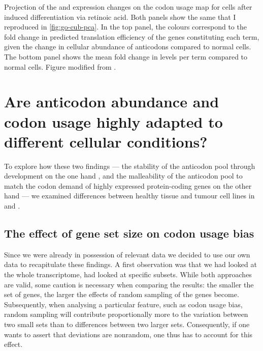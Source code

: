     {Projection of the \trna and \mrna expression changes on the codon usage
    map for cells after induced differentiation via retinoic acid.}
    {Both panels show the same \pca that I reproduced in \cref{fig:go-cub-pca}.
    In the top panel, the colours correspond to the fold change in predicted
    translation efficiency of the genes constituting each \go term, given the
    change in cellular abundance of \trna anticodons compared to normal cells.
    The bottom panel shows the mean fold change in \mrna levels per \go term
    compared to normal cells. Figure modified from \citet{Gingold:2014}.}

\section{Are  anticodon abundance and codon usage highly adapted to
different cellular conditions?}

To explore how these two findings — the stability of the anticodon pool through
development on the one hand \citep{Schmitt:2014}, and the malleability of the
anticodon pool to match the codon demand of highly expressed protein-coding
genes on the other hand \citep{Gingold:2014} — we examined differences between
healthy tissue and tumour cell lines in \mmu and \hsa.

\subsection{The effect of gene set size on codon usage bias}

Since we were already in possession of relevant \trna data we decided to use our
own data to recapitulate these findings. A first observation was that we had
looked at the whole transcriptome, \citet{Gingold:2014} had looked at specific
subsets. While both approaches are valid, some caution is necessary when
comparing the results: the smaller the set of genes, the larger the effects of
random sampling of the genes become. Subsequently, when analysing a particular
feature, such as codon usage bias, random sampling will contribute
proportionally more to the variation between two small sets than to differences
between two larger sets. Consequently, if one wants to assert that deviations
are nonrandom, one thus has to account for this effect.

